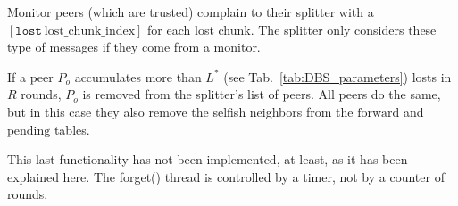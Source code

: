 
\label{sec:free_riding_control}

Monitor peers (which are trusted) complain to their splitter with a
$[\mathtt{lost}~\text{lost\_chunk\_index}]$ for each lost chunk. The
splitter only considers these type of messages if they come from a
monitor.

If a peer $P_o$ accumulates more than $L^*$ (see
Tab.~\ref{tab:DBS_parameters}) losts in $R$ rounds, $P_o$ is removed
from the splitter's list of peers. All peers do the same, but in this
case they also remove the selfish neighbors from the $\text{forward}$
and $\text{pending}$ tables.


\begin{notex}
This last functionality has not been implemented, at least, as it has
been explained here. The forget() thread is controlled by a timer, not
by a counter of rounds.
\end{notex}

